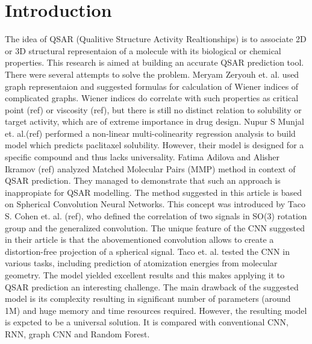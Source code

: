 \documentclass[12pt,twoside]{article}
\begin{document}
\section{Introduction}
    The idea of QSAR (Qualitive Structure Activity Realtionships) is to associate 2D or 3D structural representaion of a molecule with its biological or chemical properties. 
    This research is aimed at building an accurate QSAR prediction tool. There were several attempts to solve the problem. Meryam Zeryouh et. al. \cite{Wiener15} used graph representaion and suggested formulas for calculation of Wiener indices of complicated graphs. 
    Wiener indices do correlate with such properties as critical point (ref) or viscosity (ref), but there is still no distinct relation to solubility or target activity, which are of extreme importance in drug design. 
    Nupur S Munjal et. al.(ref) performed a non-linear multi-colinearity regression analysis to build model which predicts paclitaxel solubility. However, their model is designed for a specific compound and thus lacks universality. 
    Fatima Adilova and Alisher Ikramov (ref) analyzed Matched Molecular Pairs (MMP) method in context of QSAR prediction. They managed to demonstrate that such an approach is inappropiate for QSAR modelling. 
\newline
    The method suggested in this article is based on Spherical Convolution Neural Networks. This concept was introduced by Taco S. Cohen et. al. (ref), who defined the correlation of two signals in SO(3) rotation group and the generalized convolution. 
    The unique feature of the CNN suggested in their article is that the abovementioned convolution allows to create a distortion-free projection of a spherical signal.
     Taco et. al. tested the CNN in various tasks, including prediction of atomization energies from molecular geometry. The model yielded excellent results and this makes applying it to QSAR prediction an interesting challenge. 
\newline
    The main drawback of the suggested model is its complexity resulting in significant number of parameters (around 1M) and huge memory and time resources required. 
    However, the resulting model is expcted to be a universal solution. It is compared with conventional CNN, RNN, graph CNN and Random Forest.
\end{document}

